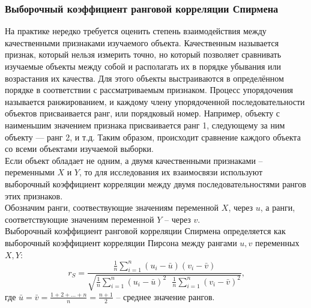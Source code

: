 \documentclass[main.tex]{subfiles}
\begin{document}
\subsubsection{Выборочный коэффициент ранговой корреляции Спирмена}
На практике нередко требуется оценить степень взаимодействия между качественными признаками изучаемого объекта. Качественным называется признак, который нельзя измерить точно, но который позволяет сравнивать изучаемые объекты между собой и располагать их в порядке убывания или возрастания их качества. Для этого объекты выстраиваются в определённом порядке в соответствии с рассматриваемым признаком. Процесс упорядочения называется ранжированием, и каждому члену упорядоченной последовательности объектов присваивается ранг, или порядковый номер. Например, объекту с наименьшим значением признака присваивается ранг 1, следующему за ним объекту — ранг 2, и т.д. Таким образом, происходит сравнение каждого объекта со всеми объектами изучаемой выборки. \\
Если объект обладает не одним, а двумя качественными признаками -- переменными $X \text{ и } Y$, то для исследования их взаимосвязи используют выборочный коэффициент корреляции между двумя последовательностями рангов этих признаков. \\
Обозначим ранги, соотвествующие значениям переменной $X$, через $u$, а ранги, соответствующие значениям переменной $Y$ -- через $v$. \\
Выборочный коэффициент ранговой корреляции Спирмена определяется как выборочный коэффициент корреляции Пирсона между рангами $u, v$ переменных $X, Y$:
\begin{equation}
	r_S = \dfrac{\frac{1}{n} \sum_{i=1}^{n} (u_i - \bar{u})(v_i - \bar{v})}{\sqrt{\frac{1}{n} \sum_{i=1}^{n} (u_i - \bar{u})^2 \text{ } \frac{1}{n} \sum_{i=1}^{n} (v_i - \bar{v})^2}} \text{,}
\end{equation}
где $\bar{u} = \bar{v} = \frac{1+2+ \dots + n}{n} = \frac{n+1}{2}$ -- среднее значение рангов.
\end{document}
